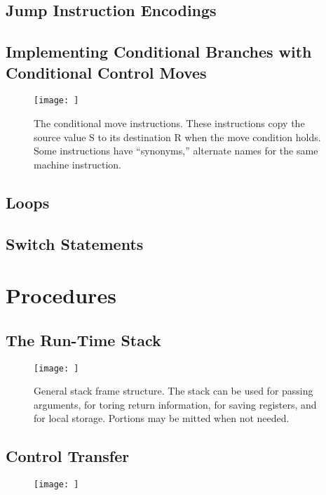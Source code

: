 \subsection{Jump Instruction Encodings}


\subsection{Implementing Conditional Branches with Conditional Control Moves}


\begin{figure}[h!]
    \centering
    \texttt{[image: ]}
    \caption{The conditional move instructions. These instructions copy the source    value S to its destination R when the move condition holds. Some instructions have    “synonyms,” alternate names for the same machine instruction.}
\end{figure}

\subsection{Loops}
\subsection{Switch Statements}


\section{Procedures}
\subsection{The Run-Time Stack}


\begin{figure}[h!]
    \centering
    \texttt{[image: ]}
    \caption{General stack frame    structure. The stack    can be used for passing    arguments, for toring    return information, for    saving registers, and for    local storage. Portions    may be mitted when not    needed.    }
\end{figure}



\subsection{Control Transfer}


\begin{figure}[h!]
    \centering
    \texttt{[image: ]}
    \caption{}
\end{figure}


